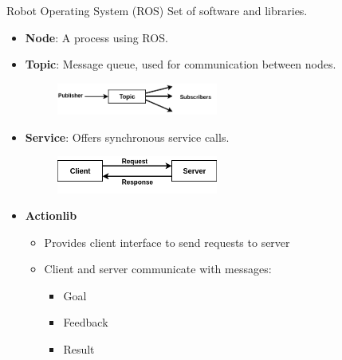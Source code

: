 \begin{frame}[allowframebreaks]{Robot Operating System (ROS)}
Set of software and libraries.
\begin{itemize}
    \item \textbf{Node}: A process using ROS. 
    \item \textbf{Topic}: Message queue, used for communication between nodes.
    \begin{figure}
        \includegraphics[width=0.5\textwidth]{gfx/topic.png}
    \end{figure}
    \item \textbf{Service}: Offers synchronous service calls.
    \begin{figure}
        \includegraphics[width=0.5\textwidth]{gfx/service.png}
    \end{figure}
    \item \textbf{Actionlib} 
    \begin{itemize}
        \item Provides client interface to send requests to server
        \item Client and server communicate with messages:
        \begin{itemize}
            \item Goal
            \item Feedback
            \item Result
        \end{itemize}
    \end{itemize} 
\end{itemize}
\end{frame}
